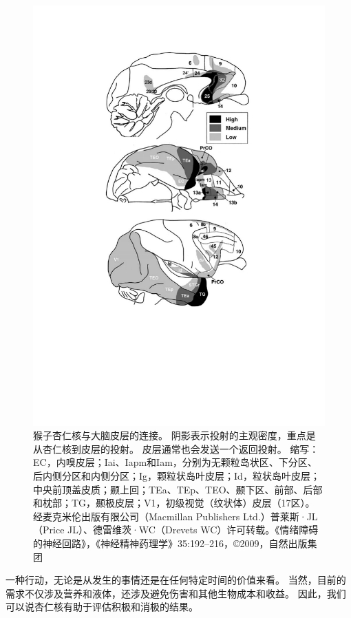 \begin{figure}[!htb]
	\centering
	\includegraphics{chap3/3_3}
	\caption{猴子杏仁核与大脑皮层的连接。
		阴影表示投射的主观密度，重点是从杏仁核到皮层的投射。
		皮层通常也会发送一个返回投射。
		缩写：EC，内嗅皮层；Iai、Iapm和Iam，分别为无颗粒岛状区、下分区、后内侧分区和内侧分区；Ig，颗粒状岛叶皮层；Id，粒状岛叶皮层；中央前顶盖皮质；颞上回；TEa、TEp、TEO、颞下区、前部、后部和枕部；TG，颞极皮层；V1，初级视觉（纹状体）皮层（17区）。
		经麦克米伦出版有限公司（Macmillan Publishers Ltd.）普莱斯·JL（Price JL）、德雷维茨·WC（Drevets WC）许可转载。《情绪障碍的神经回路》，《神经精神药理学》35:192–216，©2009，自然出版集团}
	\label{fig:3_3}
\end{figure}


一种行动，无论是从发生的事情还是在任何特定时间的价值来看。
当然，目前的需求不仅涉及营养和液体，还涉及避免伤害和其他生物成本和收益。
因此，我们可以说杏仁核有助于评估积极和消极的结果。\par


